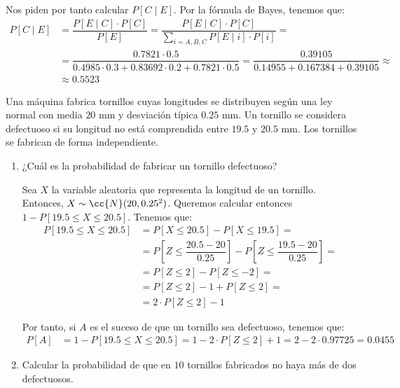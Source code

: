 \begin{ejercicio}
    Nos piden por tanto calcular $P[C\mid E]$. Por la fórmula de Bayes, tenemos que:
    \begin{align*}
        P[C\mid E] &= \dfrac{P[E\mid C]\cdot P[C]}{P[E]} = \dfrac{P[E\mid C]\cdot P[C]}{\sum\limits_{i=A,B,C} P[E\mid i]\cdot P[i]} =\\&= \dfrac{0.7821\cdot 0.5}{0.4985\cdot 0.3 + 0.83692\cdot 0.2 + 0.7821\cdot 0.5} = \dfrac{0.39105}{0.14955 + 0.167384 + 0.39105} \approx\\& \approx 0.5523
    \end{align*}
\end{ejercicio}

\begin{ejercicio}
    Una máquina fabrica tornillos cuyas longitudes se distribuyen según una ley normal con media $20$ mm y desviación típica $0.25$ mm. Un tornillo se considera defectuoso si su longitud no está comprendida entre $19.5$ y $20.5$ mm. Los tornillos se fabrican de forma independiente.
    \begin{enumerate}
        \item ¿Cuál es la probabilidad de fabricar un tornillo defectuoso?
        
        Sea $X$ la variable aleatoria que representa la longitud de un tornillo. Entonces, $X\sim \cc{N}(20,0.25^2)$.
        Queremos calcular entonces $1-P[19.5\leq X\leq 20.5]$. Tenemos que:
        \begin{align*}
            P[19.5\leq X\leq 20.5] &= P\left[X\leq 20.5\right] - P\left[X\leq 19.5\right] =\\&= P\left[Z\leq \dfrac{20.5-20}{0.25}\right] - P\left[Z\leq \dfrac{19.5-20}{0.25}\right] =\\&= P\left[Z\leq 2\right] - P\left[Z\leq -2\right] =\\&= P\left[Z\leq 2\right] - 1 + P\left[Z\leq 2\right] =\\&= 2\cdot P\left[Z\leq 2\right] - 1
        \end{align*}

        Por tanto, si $A$ es el suceso de que un tornillo sea defectuoso, tenemos que:
        \begin{align*}
            P[A] &= 1-P[19.5\leq X\leq 20.5] = 1-2\cdot P\left[Z\leq 2\right] + 1 = 2-2\cdot 0.97725 = 0.0455
        \end{align*}
        \item Calcular la probabilidad de que en $10$ tornillos fabricados no haya más de dos defectuosos.
        

\end{enumerate}
\end{ejercicio}
